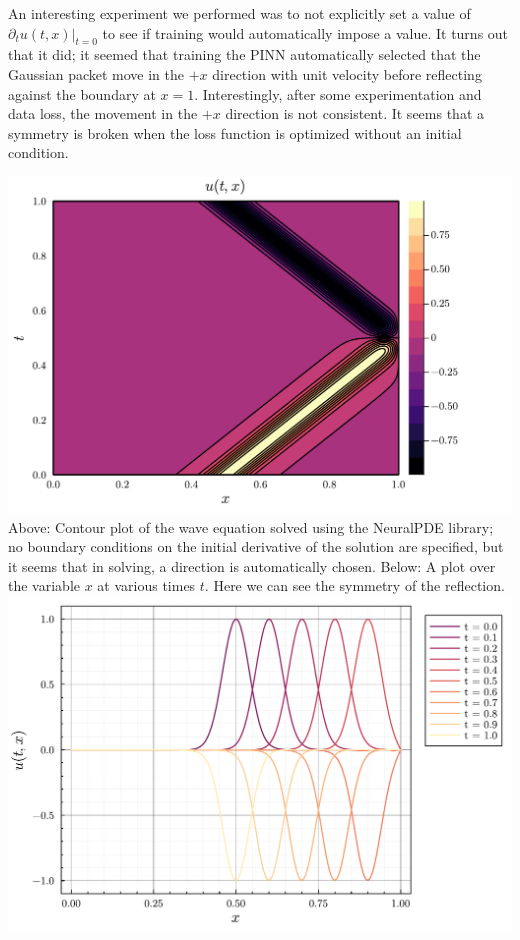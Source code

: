 \documentclass[11pt]{article}
\newcommand{\1}{\mathbf 1}
\begin{document}
An interesting experiment we performed was to not explicitly set a value of $\left.\partial_t u(t,x)\right|_{t = 0}$ to see if training would automatically impose a value.
It turns out that it did; it seemed that training the PINN automatically selected that the Gaussian packet move in the $+x$ direction with unit velocity before reflecting against the boundary at $x = 1$.
Interestingly, after some experimentation and data loss, the movement in the $+x$ direction is not consistent.
It seems that a symmetry is broken when the loss function is optimized without an initial condition.
\begin{singlespace}
\begin{center}
	\includegraphics[width=0.9\linewidth]{fig/wave-no-bcs-cont.pdf}
	\\
	Above: Contour plot of the wave equation solved using the NeuralPDE library; no boundary conditions on the initial derivative of the solution are specified, but it seems that in solving, a direction is automatically chosen.
	Below: A plot over the variable $x$ at various times $t$.
	Here we can see the symmetry of the reflection.
	\\
	\includegraphics[width=0.89\linewidth]{fig/wave-no-bcs-per-x.pdf}
\end{center}
\end{singlespace}
\end{document}
